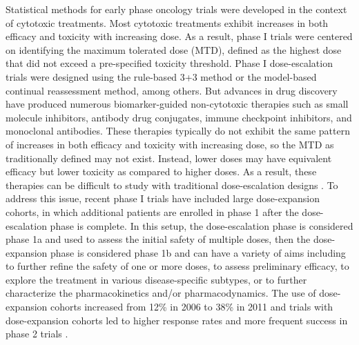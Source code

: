 Statistical methods for early phase oncology trials were developed in
the context of cytotoxic treatments. Most cytotoxic treatments exhibit
increases in both efficacy and toxicity with increasing dose. As a
result, phase I trials were centered on identifying the maximum
tolerated dose (MTD), defined as the highest dose that did not exceed a
pre-specified toxicity threshold. Phase I dose-escalation trials were
designed using the rule-based 3+3 method or the model-based continual
reassessment method, among others. But advances in drug discovery have
produced numerous biomarker-guided non-cytotoxic therapies such as small
molecule inhibitors, antibody drug conjugates, immune checkpoint
inhibitors, and monoclonal antibodies. These therapies typically do not
exhibit the same pattern of increases in both efficacy and toxicity with
increasing dose, so the MTD as traditionally defined may not exist.
Instead, lower doses may have equivalent efficacy but lower toxicity as
compared to higher doses. As a result, these therapies can be difficult
to study with traditional dose-escalation designs \citep{Pestana2020}.
To address this issue, recent phase I trials have included large
dose-expansion cohorts, in which additional patients are enrolled in
phase 1 after the dose-escalation phase is complete. In this setup, the
dose-escalation phase is considered phase 1a and used to assess the
initial safety of multiple doses, then the dose-expansion phase is
considered phase 1b and can have a variety of aims including to further
refine the safety of one or more doses, to assess preliminary efficacy,
to explore the treatment in various disease-specific subtypes, or to
further characterize the pharmacokinetics and/or pharmacodynamics. The
use of dose-expansion cohorts increased from 12\% in 2006 to 38\% in
2011 \citep{Manji2013} and trials with dose-expansion cohorts led to
higher response rates and more frequent success in phase 2 trials
\citep{Bugano2017}.

